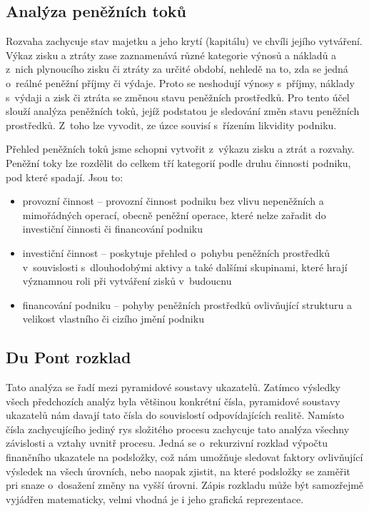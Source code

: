 \subsection{Analýza peněžních toků}
Rozvaha zachycuje stav majetku a jeho krytí (kapitálu) ve chvíli jejího vytváření. Výkaz zisku a ztráty zase zaznamenává různé kategorie výnosů a nákladů a z~nich plynoucího zisku či ztráty za určité období, nehledě na to, zda se jedná o~reálné peněžní příjmy či výdaje. Proto se neshodují výnosy s~příjmy, náklady s~výdaji a zisk či ztráta se změnou stavu peněžních prostředků. Pro tento účel slouží analýza peněžních toků, jejíž podstatou je sledování změn stavu peněžních prostředků.\cite{komplex} Z~toho lze vyvodit, ze úzce souvisí s~řízením likvidity podniku.



Přehled peněžních toků jsme schopni vytvořit z~výkazu zisku a ztrát a rozvahy. Peněžní toky lze rozdělit do celkem tří kategorií podle druhu činnosti podniku, pod které spadají. Jsou to:

\begin{itemize}
  \item provozní činnost -- provozní činnost podniku bez vlivu nepeněžních a mimořádných operací, obecně peněžní operace, které nelze zařadit do investiční činnosti či financování podniku
  \item investiční činnost -- poskytuje přehled o~pohybu peněžních prostředků v~souvislosti s~dlouhodobými aktivy a také dalšími skupinami, které hrají významnou roli při vytváření zisků v~budoucnu
  \item financování podniku -- pohyby peněžních prostředků ovlivňující strukturu a velikost vlastního či cizího jmění podniku
\end{itemize}



\subsection{Du Pont rozklad}
Tato analýza se řadí mezi pyramidové soustavy ukazatelů. Zatímco výsledky všech předchozích analýz byla většinou konkrétní čísla, pyramidové soustavy ukazatelů nám davají tato čísla do souvislostí odpovídajících realitě. Namísto čísla zachycujícího jediný rys složitého procesu zachycuje tato analýza všechny závislosti a vztahy uvnitř procesu. Jedná se o~rekurzivní rozklad výpočtu finančního ukazatele na podsložky, což nám umožňuje sledovat faktory ovlivňující výsledek na všech úrovních, nebo naopak zjistit, na které podsložky se zaměřit pri snaze o~dosažení změny na vyšší úrovni. Zápis rozkladu může být samozřejmě vyjádřen matematicky, velmi vhodná je i jeho grafická reprezentace.

